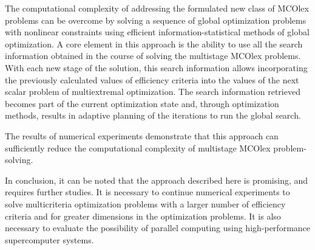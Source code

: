 \documentclass[smallextended]{svjour3}       %
\begin{document}
The computational complexity of addressing the formulated new class of MCOlex problems can be overcome by solving a sequence of global optimization problems with nonlinear constraints using efficient information-statistical methods of global optimization. A core element in this approach is the ability to use all the search information obtained in the course of solving the multistage MCOlex problems. With each new stage of the solution, this search information allows incorporating the previously calculated values of efficiency criteria into the values of the next scalar problem of multiextremal optimization. The search information retrieved becomes part of the current optimization state and, through optimization methods, results in adaptive planning of the iterations to run the global search. 

The results of numerical experiments demonstrate that this approach can sufficiently reduce the computational complexity of multistage MCOlex problem-solving.

In conclusion, it can be noted that the approach described here is promising, and requires further studies. It is necessary to continue numerical experiments to solve multicriteria optimization problems with a larger number of efficiency criteria and for greater dimensions in the optimization problems. It is also necessary to evaluate the possibility of parallel computing using high-performance supercomputer systems.
\end{document}
